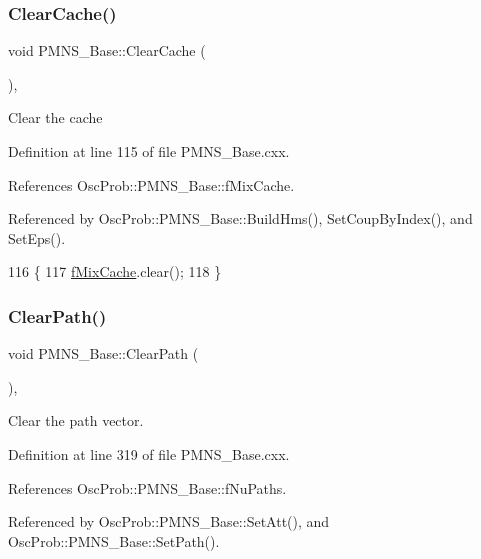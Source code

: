 \subsubsection{\texorpdfstring{Clear\+Cache()}{ClearCache()}}
{\footnotesize\ttfamily void P\+M\+N\+S\+\_\+\+Base\+::\+Clear\+Cache (\begin{DoxyParamCaption}{ }\end{DoxyParamCaption})\hspace{0.3cm}{\ttfamily [virtual]}, {\ttfamily [inherited]}}

Clear the cache 

Definition at line 115 of file P\+M\+N\+S\+\_\+\+Base.\+cxx.



References Osc\+Prob\+::\+P\+M\+N\+S\+\_\+\+Base\+::f\+Mix\+Cache.



Referenced by Osc\+Prob\+::\+P\+M\+N\+S\+\_\+\+Base\+::\+Build\+Hms(), Set\+Coup\+By\+Index(), and Set\+Eps().


\begin{DoxyCode}
116 \{
117   \hyperlink{classOscProb_1_1PMNS__Base_a8159424f20197a3a7145fe3bf2c11176}{fMixCache}.clear();
118 \}
\end{DoxyCode}
\mbox{\label{classOscProb_1_1PMNS__Base_aefe521239031c418cfaaaa550a6e13bb}} 
\subsubsection{\texorpdfstring{Clear\+Path()}{ClearPath()}}
{\footnotesize\ttfamily void P\+M\+N\+S\+\_\+\+Base\+::\+Clear\+Path (\begin{DoxyParamCaption}{ }\end{DoxyParamCaption})\hspace{0.3cm}{\ttfamily [virtual]}, {\ttfamily [inherited]}}

Clear the path vector. 

Definition at line 319 of file P\+M\+N\+S\+\_\+\+Base.\+cxx.



References Osc\+Prob\+::\+P\+M\+N\+S\+\_\+\+Base\+::f\+Nu\+Paths.



Referenced by Osc\+Prob\+::\+P\+M\+N\+S\+\_\+\+Base\+::\+Set\+Att(), and Osc\+Prob\+::\+P\+M\+N\+S\+\_\+\+Base\+::\+Set\+Path().


